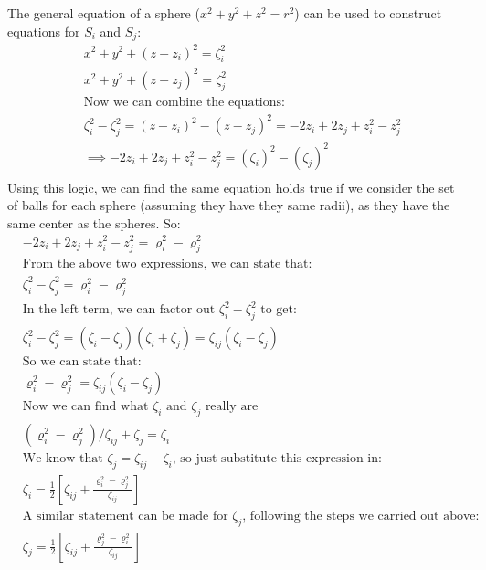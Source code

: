 \documentclass{article}
\begin{document}
The general equation of a sphere ($x^2 + y^2 +z^2 = r^2$) can be used to construct equations for $S_i$ and $S_j$:
\begin{align*}
&x^2 + y^2 +(z-z_i)^2 = \zeta_i^2 \\
&x^2 + y^2 +(z-z_j)^2 = \zeta_j^2 \\
&\text{Now we can combine the equations:} \\
&\zeta_i^2-\zeta_j^2 =(z-z_i)^2-(z-z_j)^2=-2z_i +2z_j +z_i^2 - z_j^2\\
& \implies -2z_i +2z_j +z_i^2 - z_j^2 = (\zeta_i)^2-(\zeta_j)^2\\
\end{align*}
Using this logic, we can find the same equation holds true if we consider the set of balls for each sphere (assuming they have they same radii), as they have the same center as the spheres. So:
\begin{align*}
&-2z_i +2z_j +z_i^2 - z_j^2 = \varrho_i^2-\varrho_j^2 \\
&\text{From the above two expressions, we can state that:} \\
&\zeta_i^2-\zeta_j^2 = \varrho_i^2-\varrho_j^2\\
&\text{In the left term, we can factor out $\zeta_i^2-\zeta_j^2$ to get:} \\
&\zeta_i^2-\zeta_j^2 =(\zeta_i-\zeta_j)(\zeta_i+\zeta_j) = \zeta_{ij}(\zeta_i-\zeta_j) \\
&\text{So we can state that:} \\
&\varrho_i^2 - \varrho_j^2  = \zeta_{ij}(\zeta_i-\zeta_j) \\
&\text{Now we can find what $\zeta_i$ and $\zeta_j$ really are} \\
&(\varrho_i^2 - \varrho_j^2)/\zeta_{ij} + \zeta_j = \zeta_i \\
&\text{We know that $\zeta_j = \zeta_{ij} - \zeta_i$, so just substitute this expression in:} \\
&\zeta_i = \frac{1}{2}\left[\zeta_{ij}+\frac{\varrho_i^2-\varrho_j^2}{\zeta_{ij}}\right] \\
&\text{A similar statement can be made for $\zeta_j$, following the steps we carried out above:} \\
&\zeta_j = \frac{1}{2}\left[\zeta_{ij}+\frac{\varrho_j^2-\varrho_i^2}{\zeta_{ij}}\right]
\end{align*}
\end{document}
